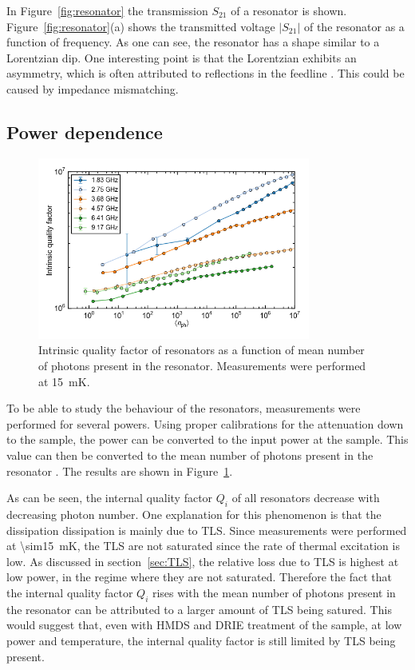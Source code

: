 \documentclass[12pt]{report}
\begin{document}
 In Figure~\ref{fig:resonator} the transmission $S_{21}$ of a resonator is shown. Figure~\ref{fig:resonator}(a) shows the transmitted voltage $|S_{21}|$ of the resonator as a function of frequency. As one can see, the resonator has a shape similar to a Lorentzian dip. One interesting point is that the Lorentzian exhibits an asymmetry, which is often attributed to reflections in the feedline \cite[p.~192]{Geerlings}. This could be caused by impedance mismatching.


\subsection{Power dependence}
\label{sec:resonator:results:power_dependence}

\begin{figure}
    \centering
    \includegraphics[width=0.8\textwidth]{Figures/Qi_vs_n_photon.png}
    \caption{Intrinsic quality factor of resonators as a function of mean number of photons present in the resonator. Measurements were performed at \SI{15}{\milli \kelvin}.}
    \label{fig:Qi_vs_n_photon}
\end{figure}
To be able to study the behaviour of the resonators, measurements were performed for several powers. Using proper calibrations for the attenuation down to the sample, the power can be converted to the input power at the sample. This value can then be converted to the mean number of photons present in the resonator \cite{DRIE}. The results are shown in Figure~\ref{fig:Qi_vs_n_photon}.

As can be seen, the internal quality factor $Q_i$ of all resonators decrease with decreasing photon number. One explanation for this phenomenon is that the dissipation dissipation is mainly due to TLS. Since measurements were performed at \SI{\sim15}{mK}, the TLS are not saturated since the rate of thermal excitation is low. As discussed in section~\ref{sec:TLS}, the relative loss due to TLS is highest at low power, in the regime where they are not saturated. Therefore the fact that the internal quality factor $Q_i$ rises with the mean number of photons present in the resonator can be attributed to a larger amount of TLS being satured. This would suggest that, even with HMDS and DRIE treatment of the sample, at low power and temperature, the internal quality factor is still limited by TLS being present.
\end{document}
